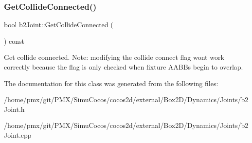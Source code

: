 \subsubsection{\texorpdfstring{Get\+Collide\+Connected()}{GetCollideConnected()}\hspace{0.1cm}{\footnotesize\ttfamily [2/2]}}
{\footnotesize\ttfamily bool b2\+Joint\+::\+Get\+Collide\+Connected (\begin{DoxyParamCaption}{ }\end{DoxyParamCaption}) const\hspace{0.3cm}{\ttfamily [inline]}}

Get collide connected. Note\+: modifying the collide connect flag won\textquotesingle{}t work correctly because the flag is only checked when fixture A\+A\+B\+Bs begin to overlap. 

The documentation for this class was generated from the following files\+:\begin{DoxyCompactItemize}
\item 
/home/pmx/git/\+P\+M\+X/\+Simu\+Cocos/cocos2d/external/\+Box2\+D/\+Dynamics/\+Joints/b2\+Joint.\+h\item 
/home/pmx/git/\+P\+M\+X/\+Simu\+Cocos/cocos2d/external/\+Box2\+D/\+Dynamics/\+Joints/b2\+Joint.\+cpp\end{DoxyCompactItemize}
